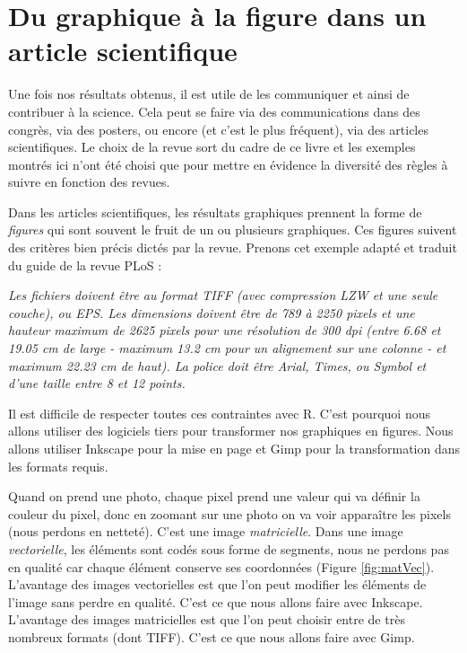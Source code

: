 \documentclass[twoside,symmetric]{book}
\begin{document}
\hypertarget{graph4}{%
\chapter{Du graphique à la figure dans un article scientifique}\label{graph4}}

\minitoc

Une fois nos résultats obtenus, il est utile de les communiquer et ainsi de contribuer à la science. Cela peut se faire via des communications dans des congrès, via des posters, ou encore (et c'est le plus fréquent), via des articles scientifiques. Le choix de la revue sort du cadre de ce livre et les exemples montrés ici n'ont été choisi que pour mettre en évidence la diversité des règles à suivre en fonction des revues.

Dans les articles scientifiques, les résultats graphiques prennent la forme de \emph{figures} qui sont souvent le fruit de un ou plusieurs graphiques. Ces figures suivent des critères bien précis dictés par la revue. Prenons cet exemple adapté et traduit du guide de la revue PLoS :

\emph{Les fichiers doivent être au format TIFF (avec compression LZW et une seule couche), ou EPS. Les dimensions doivent être de 789 à 2250 pixels et une hauteur maximum de 2625 pixels pour une résolution de 300 dpi (entre 6.68 et 19.05 cm de large - maximum 13.2 cm pour un alignement sur une colonne - et maximum 22.23 cm de haut). La police doit être Arial, Times, ou Symbol et d'une taille entre 8 et 12 points.}

Il est difficile de respecter toutes ces contraintes avec R. C'est pourquoi nous allons utiliser des logiciels tiers pour transformer nos graphiques en figures. Nous allons utiliser Inkscape pour la mise en page et Gimp pour la transformation dans les formats requis.

Quand on prend une photo, chaque pixel prend une valeur qui va définir la couleur du pixel, donc en zoomant sur une photo on va voir apparaître les pixels (nous perdons en netteté). C'est une image \emph{matricielle}. Dans une image \emph{vectorielle}, les éléments sont codés sous forme de segments, nous ne perdons pas en qualité car chaque élément conserve ses coordonnées (Figure \ref{fig:matVec}). L'avantage des images vectorielles est que l'on peut modifier les éléments de l'image sans perdre en qualité. C'est ce que nous allons faire avec Inkscape. L'avantage des images matricielles est que l'on peut choisir entre de très nombreux formats (dont TIFF). C'est ce que nous allons faire avec Gimp.
\end{document}

